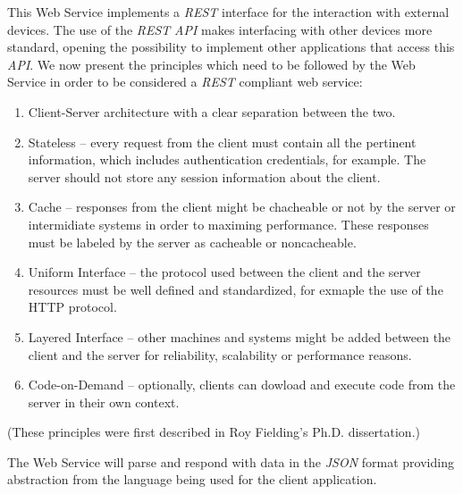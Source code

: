 This Web Service implements a \emph{\ac{REST}} interface for the interaction
with external devices. The use of the \emph{\ac{REST}} \emph{\ac{API}} makes
interfacing with other devices more standard, opening the possibility to
implement other applications that access this \emph{\ac{API}}.
We now present the principles which need to be followed by the Web Service in
order to be considered a \emph{\ac{REST}} compliant web service:
\begin{enumerate}
	\item Client-Server architecture with a clear separation between the two.
	\item Stateless -- every request from the client must contain all the
		pertinent information, which includes authentication credentials, for
		example. The server should not store any session information about the
		client.
	\item Cache -- responses from the client might be chacheable or not by the
		server or intermidiate systems in order to maximing performance. These
		responses must be labeled by the server as cacheable or noncacheable.
	\item Uniform Interface -- the protocol used between the client and the
		server resources must be well defined and standardized, for exmaple the
		use of the HTTP protocol.
	\item Layered Interface -- other machines and systems might be added between
		the client and the server for reliability, scalability or performance
		reasons.
	\item Code-on-Demand -- optionally, clients can dowload and execute code
		from the server in their own context.
\end{enumerate}
(These principles were first described in Roy Fielding's Ph.D. dissertation.)

The Web Service will parse and respond with data in the \emph{\ac{JSON}} format
providing abstraction from the language being used for the client application.

